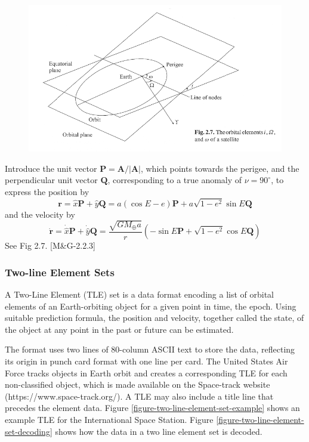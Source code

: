 \documentclass[11pt]{article}
\begin{document}
\begin{figure}
  \begin{center}
    \includegraphics{figure-2-7.pdf}
  \end{center}
\end{figure}

Introduce the unit vector $\boldsymbol{P} =
\boldsymbol{A}/|\boldsymbol{A}|$, which points towards the perigee,
and the perpendicular unit vector $\boldsymbol{Q}$, corresponding to a
true anomaly of $\nu = 90^{\circ}$, to express the position by
\begin{equation}
  \boldsymbol{r}
  = \hat{x}\boldsymbol{P} + \hat{y}\boldsymbol{Q}
  = a(\cos E - e)\boldsymbol{P}
    + a\sqrt{1 - e^2}\sin E\boldsymbol{Q} \label{2.43}\tag{2.43}
\end{equation}
and the velocity by
\begin{equation}
  \dot{\boldsymbol{r}}
  = \dot{\hat{x}}\boldsymbol{P} + \dot{\hat{y}}\boldsymbol{Q}
  = \frac{\sqrt{GM_{\oplus}a}}{r}(-\sin E\boldsymbol{P}
    + \sqrt{1 - e^2}\cos E\boldsymbol{Q}) \label{2.44}\tag{2.44}
\end{equation}
See Fig 2.7. [M\&G-2.2.3]

\subsubsection{Two-line Element Sets}

A Two-Line Element (TLE) set is a data format encoding a list of
orbital elements of an Earth-orbiting object for a given point in
time, the epoch.  Using suitable prediction formula, the position and
velocity, together called the state, of the object at any point in the
past or future can be estimated.

The format uses two lines of 80-column ASCII text to store the data,
reflecting its origin in punch card format with one line per card.
The United States Air Force tracks objects in Earth orbit and creates
a corresponding TLE for each non-classified object, which is made
available on the Space-track website (https://www.space-track.org/).
A TLE may also include a title line that precedes the element data.
Figure \ref{figure-two-line-element-set-example} shows an example TLE
for the International Space Station. Figure
\ref{figure-two-line-element-set-decoding} shows how the data in a two
line element set is decoded.
\end{document}
